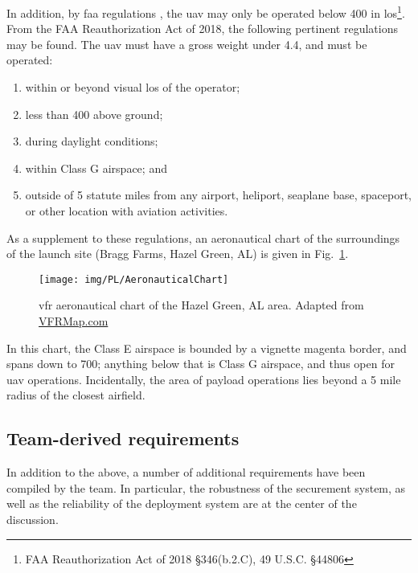 In addition, by \gls{faa} regulations \citep{FederalAviationAdministration2018}, the \gls{uav} may only be operated below \SI{400}{\feet} in \gls{los}\footnote{FAA Reauthorization Act of 2018 \S 346(b.2.C), 49 U.S.C. \S 44806}. From the FAA Reauthorization Act of 2018, the following pertinent regulations may be found. The \gls{uav} must have a gross weight under \SI{4.4}{\poundm}, and must be operated:

\begin{enumerate}[noitemsep, label=(\roman*)]
	\item within or beyond visual \gls{los} of the operator;
	\item less than \SI{400}{\feet} above ground;
	\item during daylight conditions;
	\item within Class G airspace; and
	\item outside of 5 statute miles from any airport, heliport, seaplane base, spaceport, or other location with aviation activities.
\end{enumerate}

As a supplement to these regulations, an aeronautical chart of the surroundings of the launch site (Bragg Farms, Hazel Green, AL) is given in Fig.~\ref{fig:PL:Deployment:VFRchart}.

\begin{figure}[H]
	\centering
	\texttt{[image: img/PL/AeronauticalChart]}
	\caption[VFR aeronautical chart of the Hazel Green, AL area]{\gls{vfr} aeronautical chart of the Hazel Green, AL area. Adapted from \href{http://vfrmap.com/}{VFRMap.com}}
	\label{fig:PL:Deployment:VFRchart}
\end{figure}

In this chart, the Class E airspace is bounded by a vignette magenta border, and spans down to \SI{700}{\feet}; anything below that is Class G airspace, and thus open for \gls{uav} operations. Incidentally, the area of payload operations lies beyond a 5 mile radius of the closest airfield.

\subsection{Team-derived requirements}

In addition to the above, a number of additional requirements have been compiled by the team. In particular, the robustness of the securement system, as well as the reliability of the deployment system are at the center of the discussion.

